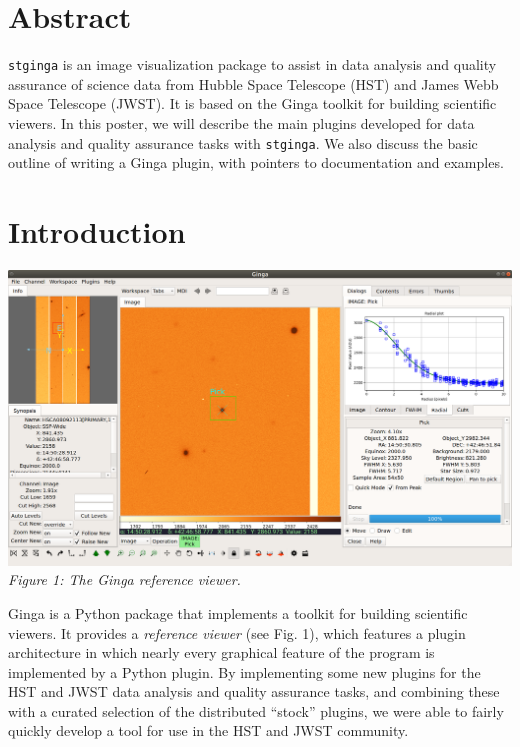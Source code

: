 \documentclass[]{article}
\begin{document}
\medskip
\begin{multicols}{3}

\section*{Abstract}
{\tt stginga}\cite{stginga} is an image visualization package to assist
in data analysis and quality assurance of science data from Hubble Space
Telescope (HST) and James Webb Space Telescope (JWST).  It is based on the
Ginga\cite{ginga} toolkit for building scientific viewers.
In this poster, we will describe the main plugins developed for data
analysis and quality assurance tasks with {\tt stginga}.  We also discuss the
basic outline of writing a Ginga plugin, with pointers to documentation
and examples.

\section*{Introduction}

\begin{center}
\includegraphics[width=8in]{ref_viewer}
\label{fig:refviewer}
\vspace*{0.4em}
{\small\em Figure 1: The Ginga reference viewer.}
\end{center}

\para
Ginga\cite{Jeschke15A} is a Python package that
implements a toolkit for building scientific viewers.  It provides
a \emph{reference viewer} (see Fig. 1), which features
a plugin architecture in which nearly every graphical feature of the
program is implemented by a Python plugin.
By implementing some new plugins for the HST and JWST data analysis and
quality assurance tasks, and combining these with a curated selection of
the distributed ``stock'' plugins, we were able to fairly quickly
develop a tool for use in the HST and JWST community.


\end{multicols}
\end{document}
